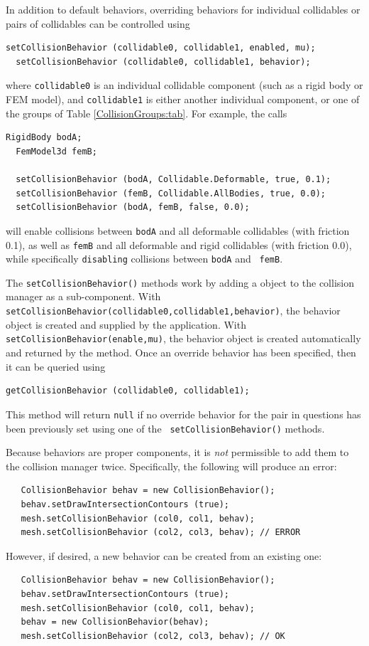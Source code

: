 In addition to default behaviors, overriding behaviors for individual
collidables or pairs of collidables can be controlled using
%
\begin{lstlisting}[]
  setCollisionBehavior (collidable0, collidable1, enabled, mu);
  setCollisionBehavior (collidable0, collidable1, behavior);
\end{lstlisting}
%
where {\tt collidable0} is an
individual collidable component (such as a rigid body or FEM model),
and {\tt collidable1} is either another individual component, or one of the
groups of Table \ref{CollisionGroups:tab}.
For example, the calls
\begin{lstlisting}[]
  RigidBody bodA; 
  FemModel3d femB;

  setCollisionBehavior (bodA, Collidable.Deformable, true, 0.1);
  setCollisionBehavior (femB, Collidable.AllBodies, true, 0.0);
  setCollisionBehavior (bodA, femB, false, 0.0);
\end{lstlisting}
will enable collisions between {\tt bodA} and all deformable
collidables (with friction 0.1), as well as {\tt femB} and all
deformable and rigid collidables (with friction 0.0), while
specifically {\tt disabling} collisions between {\tt bodA} and {\tt
femB}.

The {\tt setCollisionBehavior()} methods work by adding a
 object to the
collision manager as a sub-component. With {\tt
setCollisionBehavior(collidable0,collidable1,behavior)}, the behavior
object is created and supplied by the application.  With {\tt
setCollisionBehavior(enable,mu)}, the behavior object is created
automatically and returned by the method. Once an override behavior
has been specified, then it can be queried using
%
\begin{lstlisting}[]
  getCollisionBehavior (collidable0, collidable1);
\end{lstlisting}
%
This method will return {\tt null} if no override behavior for the
pair in questions has been previously set using one of the {\tt
setCollisionBehavior()} methods.

\begin{sideblock}
Because behaviors are proper components, it is {\it not} permissible to
add them to the collision manager twice. Specifically, the following
will produce an error:
\begin{verbatim}
   CollisionBehavior behav = new CollisionBehavior();
   behav.setDrawIntersectionContours (true); 
   mesh.setCollisionBehavior (col0, col1, behav);
   mesh.setCollisionBehavior (col2, col3, behav); // ERROR
\end{verbatim}
However, if desired, a new behavior can be created from an existing
one:
\begin{verbatim}
   CollisionBehavior behav = new CollisionBehavior();
   behav.setDrawIntersectionContours (true); 
   mesh.setCollisionBehavior (col0, col1, behav);
   behav = new CollisionBehavior(behav);
   mesh.setCollisionBehavior (col2, col3, behav); // OK
\end{verbatim}
\end{sideblock}

